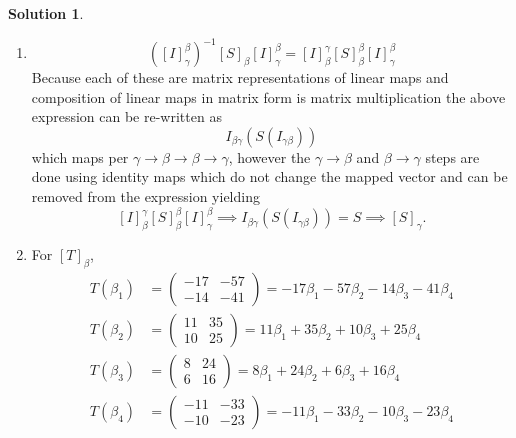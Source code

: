 \documentclass[10pt]{article}
\theoremstyle{definition}
\newtheorem{soln}{Solution}
\begin{document}
\begin{soln}~
  \begin{enumerate}[label=(\alph*)]
    \item $$\left(\left[I\right]_\gamma^\beta\right)^{-1}\left[S\right]_\beta\left[I\right]_\gamma^\beta
            = \left[I\right]_\beta^\gamma\left[S\right]_\beta^\beta\left[I\right]_\gamma^\beta$$
          Because each of these are matrix representations of linear maps and composition of linear maps in matrix form is matrix multiplication the above expression can be
          re-written as
          $$I_{\beta\gamma}(S(I_{\gamma\beta}))$$
          which maps per $\gamma\to\beta\to\beta\to\gamma$, however the $\gamma\to\beta$ and $\beta\to\gamma$ steps are done using identity maps which do not change the
          mapped vector and can be removed from the expression yielding
          $$\left[I\right]_\beta^\gamma\left[S\right]_\beta^\beta\left[I\right]_\gamma^\beta\implies I_{\beta\gamma}(S(I_{\gamma\beta}))=S\implies\left[S\right]_\gamma.$$
    \item For $\left[T\right]_\beta$,
          \begin{align*}
            T(\beta_1) & =\begin{pmatrix}
                            -17 & -57 \\
                            -14 & -41
                          \end{pmatrix}=-17\beta_1-57\beta_2-14\beta_3-41\beta_4 \\
            T(\beta_2) & =\begin{pmatrix}
                            11 & 35 \\
                            10 & 25
                          \end{pmatrix}=11\beta_1+35\beta_2+10\beta_3+25\beta_4  \\
            T(\beta_3) & =\begin{pmatrix}
                            8 & 24 \\
                            6 & 16
                          \end{pmatrix}=8\beta_1+24\beta_2+6\beta_3+16\beta_4    \\
            T(\beta_4) & =\begin{pmatrix}
                            -11 & -33 \\
                            -10 & -23
                          \end{pmatrix}=-11\beta_1-33\beta_2-10\beta_3-23\beta_4
          \end{align*}

\end{enumerate}
\end{soln}
\end{document}
